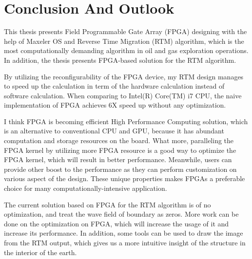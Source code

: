 \section{Conclusion And Outlook} %
\label{sec:Conclusion}

This thesis presents Field Programmable Gate Array (FPGA) designing with
the help of Maxeler OS and Reverse Time Migration (RTM) algorithm, which is
the most computationally demanding algorithm in oil and gas exploration
operations. In addition, the thesis presents FPGA-based solution for the
RTM algorithm.

By utilizing the reconfigurability of the FPGA device, my RTM design
manages to speed up the calculation in term of the hardware calculation
instead of software calculation. When comparing to Intel(R) Core(TM) i7
CPU, the naive implementation of FPGA achieves 6X speed up without any
optimization.

I think FPGA is becoming efficient High Performance Computing solution,
which is an alternative to conventional CPU and GPU, because it has
abundant computation and storage resources on the board. What more,
paralleling the FPGA kernel by utilizing more FPGA resource is a good way to
optimize the FPGA kernel, which will result in better performance.
Meanwhile, users can provide other boost to the performance as they can
perform customization on various aspect of the design. These unique
properties makes FPGAs a preferable choice for many
computationally-intensive application.

The current solution based on FPGA for the RTM algorithm is of no
optimization, and treat the wave field of boundary as zeros. More work can
be done on the optimization on FPGA, which will increase the usage of it
and  increase its performance. In addition, some tools can be used to draw
the image from the RTM output, which gives us a more intuitive insight of the
structure in the interior of the earth.
